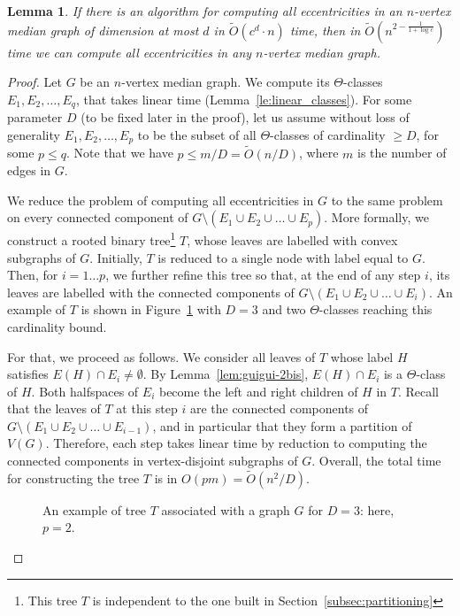 \documentclass{article}
\newtheorem{lemma}{Lemma}
\begin{document}
\begin{lemma}\label{lem:guigui-4}
If there is an algorithm for computing all eccentricities in an $n$-vertex median graph of dimension at most $d$ in $\tilde{O}(c^d \cdot n)$ time, then in $\tilde{O}(n^{2 - \frac 1 {1+\log{c}}})$ time we can compute all eccentricities in {\em any} $n$-vertex median graph.
\end{lemma}
\begin{proof}
Let $G$ be an $n$-vertex median graph.
We compute its $\Theta$-classes $E_1,E_2,\ldots,E_q$, that takes linear time (Lemma~\ref{le:linear_classes}).
For some parameter $D$ (to be fixed later in the proof), let us assume without loss of generality $E_1,E_2,\ldots,E_p$ to be the subset of all $\Theta$-classes of cardinality $\geq D$, for some $p \leq q$. Note that we have $p \leq m/D = \tilde{O}(n/D)$, where $m$ is the number of edges in $G$.

We reduce the problem of computing all eccentricities in $G$ to the same problem on every connected component of $G \setminus (E_1 \cup E_2 \cup \ldots \cup E_p)$. 
More formally, we construct a rooted binary tree\footnote{This tree $T$ is independent to the one built in Section~\ref{subsec:partitioning}} $T$, whose leaves are labelled with convex subgraphs of $G$.
Initially, $T$ is reduced to a single node with label equal to $G$.
Then, for $i = 1 \ldots p$, we further refine this tree so that, at the end of any step $i$, its leaves are labelled with the connected components of $G \setminus \left(E_1 \cup E_2 \cup \ldots \cup E_i\right)$. An example of $T$ is shown in Figure~\ref{fig:reduction} with $D=3$ and two $\Theta$-classes reaching this cardinality bound.

For that, we proceed as follows.
We consider all leaves of $T$ whose label $H$ satisfies $E(H) \cap E_i \neq \emptyset$.
By Lemma~\ref{lem:guigui-2bis}, $E(H) \cap E_i$ is a $\Theta$-class of $H$.
Both halfspaces of $E_i$ become the left and right children of $H$ in $T$.
Recall that the leaves of $T$ at this step $i$ are the connected components of $G \setminus (E_1 \cup E_2 \cup \ldots \cup E_{i-1})$, and in particular that they form a partition of $V(G)$.
Therefore, each step takes linear time by reduction to computing the connected components in vertex-disjoint subgraphs of $G$.
Overall, the total time for constructing the tree $T$ is in ${O}(pm) = \tilde{O}(n^2/D)$.

\begin{figure}[h]
\centering
\scalebox{0.7}{}
\caption{An example of tree $T$ associated with a graph $G$ for $D=3$: here, $p=2$.}
\label{fig:reduction}
\end{figure}


\end{proof}
\end{document}
